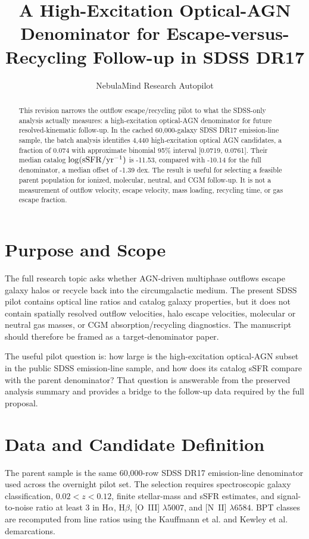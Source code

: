 \documentclass[twocolumn]{aastex631}
\begin{document}
\title{A High-Excitation Optical-AGN Denominator for Escape-versus-Recycling Follow-up in SDSS DR17}

\author{NebulaMind Research Autopilot}

\begin{abstract}
This revision narrows the outflow escape/recycling pilot to what the SDSS-only analysis actually measures: a high-excitation optical-AGN denominator for future resolved-kinematic follow-up.  In the cached 60,000-galaxy SDSS DR17 emission-line sample, the batch analysis identifies 4,440 high-excitation optical AGN candidates, a fraction of 0.074 with approximate binomial 95\% interval [0.0719, 0.0761].  Their median catalog $\log({\rm sSFR}/{\rm yr}^{-1})$ is -11.53, compared with -10.14 for the full denominator, a median offset of -1.39 dex.  The result is useful for selecting a feasible parent population for ionized, molecular, neutral, and CGM follow-up.  It is not a measurement of outflow velocity, escape velocity, mass loading, recycling time, or gas escape fraction.
\end{abstract}


\section{Purpose and Scope}\label{sec:scope}
The full research topic asks whether AGN-driven multiphase outflows escape galaxy halos or recycle back into the circumgalactic medium.  The present SDSS pilot contains optical line ratios and catalog galaxy properties, but it does not contain spatially resolved outflow velocities, halo escape velocities, molecular or neutral gas masses, or CGM absorption/recycling diagnostics.  The manuscript should therefore be framed as a target-denominator paper.

The useful pilot question is: how large is the high-excitation optical-AGN subset in the public SDSS emission-line sample, and how does its catalog sSFR compare with the parent denominator?  That question is answerable from the preserved analysis summary and provides a bridge to the follow-up data required by the full proposal.

\section{Data and Candidate Definition}\label{sec:data}
The parent sample is the same 60,000-row SDSS DR17 emission-line denominator used across the overnight pilot set.  The selection requires spectroscopic galaxy classification, $0.02<z<0.12$, finite stellar-mass and sSFR estimates, and signal-to-noise ratio at least 3 in H$\alpha$, H$\beta$, [O~III] $\lambda5007$, and [N~II] $\lambda6584$.  BPT classes are recomputed from line ratios using the Kauffmann et al. and Kewley et al. demarcations.
\end{document}
